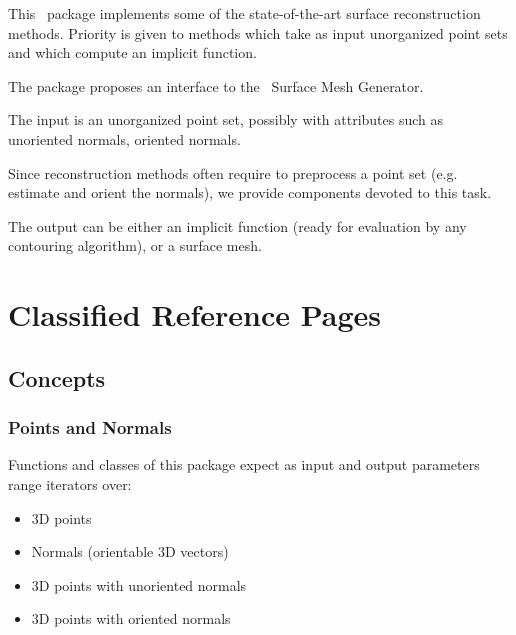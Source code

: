 



This \cgal\ package implements some of the state-of-the-art surface
reconstruction methods. Priority is given to methods
which take as input unorganized point sets and
which compute an implicit function.

The package proposes an interface to the \cgal\ Surface Mesh Generator.

The input is an unorganized point set, possibly with attributes
such as unoriented normals, oriented normals.

Since reconstruction methods often require to preprocess a point set
(e.g. estimate and orient the normals), we provide components devoted
to this task.

The output can be either an implicit function (ready for evaluation
by any contouring algorithm), or a surface mesh.


\section{Classified Reference Pages}


\subsection{Concepts}

\subsubsection{Points and Normals}

Functions and classes of this package expect as input and output parameters range iterators over:

\begin{itemize}
\item 3D points
\item Normals (orientable 3D vectors)
\item 3D points with unoriented normals
\item 3D points with oriented normals
\end{itemize}

